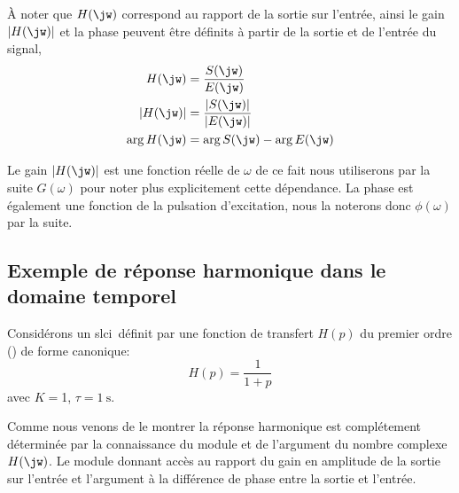 \`A noter que $H(\jw)$ correspond au rapport de la sortie sur l'entrée,
ainsi le gain $|H(\jw)|$ et la phase peuvent être définits à partir de la sortie et de l'entrée du signal,
\begin{align*}
    H(\jw) &= \dfrac{S(\jw)}{E(\jw)} \\
    |H(\jw)|&= \dfrac{|S(\jw)|}{|E(\jw)|} \\
    \arg{H(\jw)}&=\arg{S(\jw)}-\arg{E(\jw)}
\end{align*}

Le gain $|H(\jw)|$ est une fonction réelle de $\omega$ de ce fait nous utiliserons par la suite
$G(\omega)$ pour noter plus explicitement cette dépendance. La phase est également
une fonction de la pulsation d'excitation, nous la noterons donc $\phi(\omega)$ par la suite.


\subsection{Exemple de réponse harmonique dans le domaine temporel}
Considérons un \gls{slci}~définit par une fonction de transfert $H(p)$ du premier ordre () de forme canonique:
$$
H(p)=\dfrac{1}{1+p}
$$
avec $K=$1, $\tau=\SI{1}{\second}$.

Comme nous venons de le montrer la réponse harmonique est complétement 
déterminée par la connaissance du module et de l'argument du nombre complexe $H(\jw)$.
Le module donnant accès au rapport du gain en amplitude de la sortie sur l'entrée et 
l'argument à la différence de phase entre la sortie et l'entrée.

